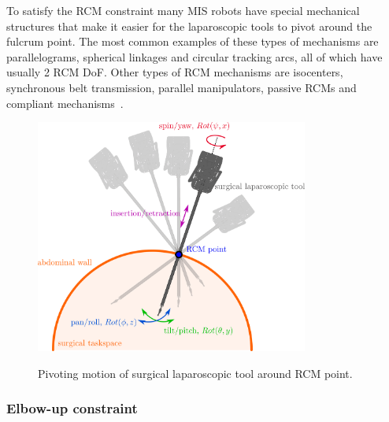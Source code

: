 To satisfy the RCM constraint many MIS robots have special mechanical structures that make it easier for the laparoscopic tools to pivot around the fulcrum point. The most common examples of these types of mechanisms are parallelograms, spherical linkages and circular tracking arcs, all of which have usually 2 RCM DoF. Other types of RCM mechanisms are isocenters, synchronous belt transmission, parallel manipulators, passive RCMs and compliant mechanisms~\cite{dai2009HIstoricalMISKinematicsRCM}. 

\begin{figure}[htbp]
\centering
\includegraphics[width=0.8\textwidth]{images/rcm-surgical-tool.png}\\
\caption{Pivoting motion of surgical laparoscopic tool around RCM point.}
\end{figure}

\subsubsection{Elbow-up constraint}
\label{section-elbow-up-constraints}

